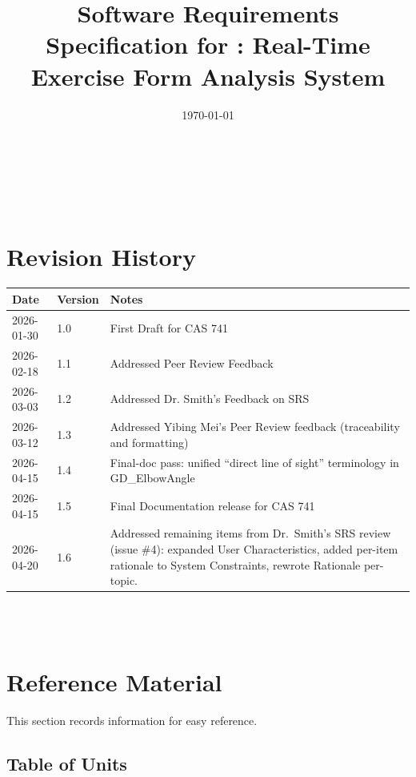 \documentclass[12pt]{article}
\begin{document}
\title{Software Requirements Specification for \progname: Real-Time Exercise Form Analysis System} 
\author{\authname}
\date{\today}
	
\maketitle

~\newpage


\tableofcontents

~\newpage

\section*{Revision History}

\begin{tabularx}{\textwidth}{p{3cm}p{2cm}X}
\toprule {\bf Date} & {\bf Version} & {\bf Notes}\\
\midrule
2026-01-30 & 1.0 & First Draft for CAS 741\\
2026-02-18 & 1.1 & Addressed Peer Review Feedback\\
2026-03-03 & 1.2 & Addressed Dr. Smith's Feedback on SRS\\
2026-03-12 & 1.3 & Addressed Yibing Mei's Peer Review feedback (traceability and formatting)\\
2026-04-15 & 1.4 & Final-doc pass: unified ``direct line of sight'' terminology in GD\_ElbowAngle\\
2026-04-15 & 1.5 & Final Documentation release for CAS 741\\
2026-04-20 & 1.6 & Addressed remaining items from Dr.\ Smith's SRS review (issue \#4): expanded User Characteristics, added per-item rationale to System Constraints, rewrote Rationale per-topic.\\
\bottomrule
\end{tabularx}

~\\

~\newpage

\section{Reference Material}

This section records information for easy reference.

\subsection{Table of Units}
\end{document}

